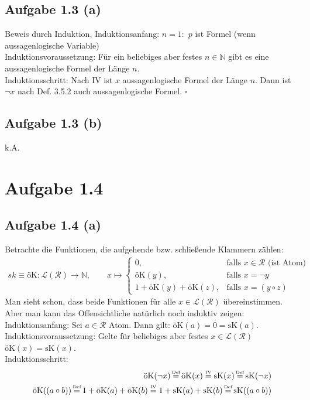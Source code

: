 \documentclass[12pt,a4paper]{article} %
\newcommand{\N}{\mathbb{N}}
\newcommand{\falls}{\text{falls }}
\newcommand{\myeq}[1]{\mathrel{\stackrel{\makebox[0pt]{\mbox{\normalfont\tiny #1}}}{=}}}
\newcommand{\ok}{\text{öK}}
\newcommand{\sk}{\text{sK}}
\begin{document}
\subsection*{Aufgabe 1.3 (a)}
Beweis durch Induktion, Induktionsanfang: $n=1:$ $p$ ist Formel (wenn aussagenlogische Variable)\\
Induktionsvoraussetzung: Für ein beliebiges aber festes $n\in\N$ gibt es eine aussagenlogische Formel der Länge $n$.\\
Induktionsschritt: Nach IV ist $x$ aussagenlogische Formel der Länge $n$. Dann ist $\neg x$ nach Def. 3.5.2 auch aussagenlogische Formel. $\square$

\subsection*{Aufgabe 1.3 (b)}
k.A.

\section*{Aufgabe 1.4}
\subsection*{Aufgabe 1.4 (a)}
Betrachte die Funktionen, die aufgehende bzw. schließende Klammern zählen:
\begin{align*}
sk\equiv\ok:\mathcal{L}(\mathcal{R})\to\N,\qquad
x\mapsto\left\lbrace\begin{array}{cl}
0, & \falls x\in\mathcal{R}\text{ (ist Atom)}\\
\ok(y), & \falls x=\neg y\\
1+\ok(y)+\ok(z), & \falls x=(y\circ z)
\end{array}\right.
\end{align*}
Man sieht schon, dass beide Funktionen für alle $x\in\mathcal{L}(\mathcal{R})$ übereinstimmen. Aber man kann das Offensichtliche natürlich noch induktiv zeigen:\\

Induktionsanfang: Sei $a\in\mathcal{R}$ Atom. Dann gilt: $\ok(a)=0=\sk(a)$.\\
Induktionsvoraussetzung: Gelte für beliebiges aber festes $x\in\mathcal{L}(\mathcal{R})$ $\ok(x)=\sk(x)$.\\ 
Induktionsschritt:
\begin{align*}
\ok(\neg x)\myeq{Def}\ok(x)\myeq{IV}\sk(x)\myeq{Def}\sk(\neg x)\\
\ok((a\circ b))\myeq{Def}1+\ok(a)+\ok(b)\myeq{IV}1+\sk(a)+\sk(b)\myeq{Def}\sk((a\circ b))
\end{align*}
\end{document}
